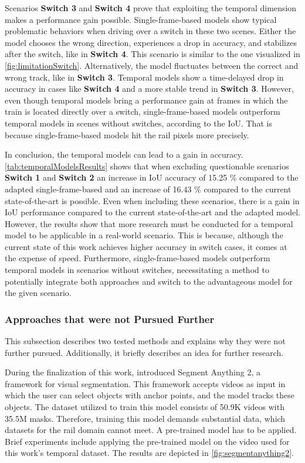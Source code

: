 Scenarios \textbf{Switch 3} and \textbf{Switch 4} prove that exploiting the temporal dimension makes a performance gain possible.
Single-frame-based models show typical problematic behaviors when driving over a switch in these two scenes.
Either the model chooses the wrong direction, experiences a drop in accuracy, and stabilizes after the switch, like in \textbf{Switch 4}.
This scenario is similar to the one visualized in \autoref{fig:limitationSwitch}.
Alternatively, the model fluctuates between the correct and wrong track, like in \textbf{Switch 3}.
Temporal models show a time-delayed drop in accuracy in cases like \textbf{Switch 4} and a more stable trend in \textbf{Switch 3}.
However, even though temporal models bring a performance gain at frames in which the train is located directly over a switch, single-frame-based models outperform temporal models in scenes without switches, according to the \ac{IoU}.
That is because single-frame-based models hit the rail pixels more precisely.

In conclusion, the temporal models can lead to a gain in accuracy.
\autoref{tab:temporalModelsResults} shows that when excluding questionable scenarios \textbf{Switch 1} and \textbf{Switch 2} an increase in \ac{IoU} accuracy of 15.25 \% compared to the adapted single-frame-based and an increase of 16.43 \% compared to the current state-of-the-art is possible.
Even when including these scenarios, there is a gain in \ac{IoU} performance compared to the current state-of-the-art and the adapted model.
However, the results show that more research must be conducted for a temporal model to be applicable in a real-world scenario.
This is because, although the current state of this work achieves higher accuracy in switch cases, it comes at the expense of speed.
Furthermore, single-frame-based models outperform temporal models in scenarios without switches, necessitating a method to potentially integrate both approaches and switch to the advantageous model for the given scenario.

\subsubsection{Approaches that were not Pursued Further}
\label{subsubsec:furtherApproachForOutlook}

This subsection describes two tested methods and explains why they were not further pursued.
Additionally, it briefly describes an idea for further research.

During the finalization of this work, \cite{segmentAnything22024} introduced Segment Anything 2, a framework for visual segmentation.
This framework accepts videos as input in which the user can select objects with anchor points, and the model tracks these objects.
The dataset utilized to train this model consists of 50.9K videos with 35.5M masks.
Therefore, training this model demands substantial data, which datasets for the rail domain cannot meet.
A pre-trained model has to be applied.
Brief experiments include applying the pre-trained model on the video used for this work's temporal dataset. 
The results are depicted in \autoref{fig:segmentanything2}.

